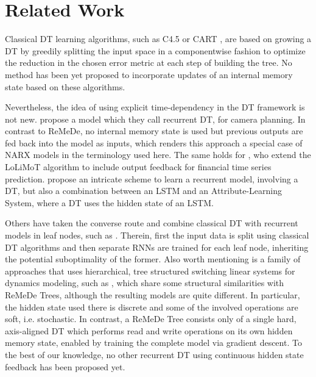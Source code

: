 \section{Related Work}
Classical DT learning algorithms, such as C4.5 \citep{quinlan2014c4} or CART \citep{breiman2017classification}, are based on growing a DT by greedily splitting the input space
in a componentwise fashion to optimize the reduction in the chosen error metric at each step of building the tree.
No method has been yet proposed to incorporate updates of an internal memory state based on these algorithms.

Nevertheless, the idea of using explicit time-dependency in the DT framework is not new.
\citep{chen2016learning} propose a model which they call recurrent DT, for camera planning. In contrast to ReMeDe, no internal memory state is used but previous outputs are fed back into the model as inputs, which renders this approach a special case of NARX models in the terminology used here. 
The same holds for \citep{chegini2010prediction}, who extend the LoLiMoT algorithm \citep{nelles1996basis} to include output feedback for financial time series prediction.
\citep{alaniz2021learningdecisiontreesrecurrently} propose an intricate scheme to learn a recurrent model, involving a DT, but also a combination between an LSTM and an Attribute-Learning System, where a DT uses the hidden state of an LSTM. 

Others have taken the converse route and combine classical DT with recurrent models in leaf nodes, such as \citep{ren2021tree}. Therein, first the input data is split using classical DT algorithms and then separate RNNs are trained for each leaf node, inheriting the potential suboptimality of the former.
Also worth mentioning is a family of approaches that uses hierarchical, tree structured switching linear systems for dynamics modeling, such as \citep{nassar2018tree}, which share some structural similarities with ReMeDe Trees, although the resulting models are quite different. In particular, the hidden state used there is discrete and some of the involved operations are soft, i.e. stochastic.
In contrast, a ReMeDe Tree consists only of a single hard, axis-aligned DT which performs read and write operations on its own hidden memory state, enabled by training the complete model via gradient descent. To the best of our knowledge, no other recurrent DT using continuous hidden state feedback has been proposed yet.